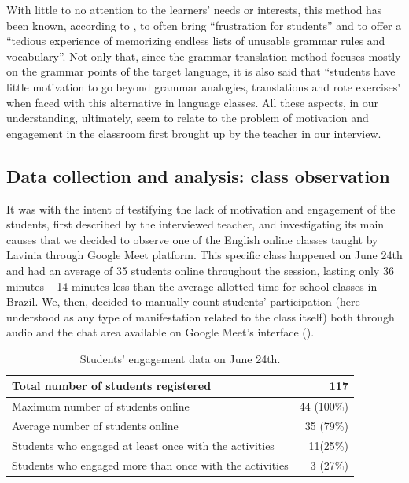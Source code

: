 \documentclass[english]{textolivre}
\begin{document}
With little to no attention to the learners’ needs or interests, this method has been known, according to \textcite[p. 7]{richards2014approaches}, to often bring “frustration for students” and to offer a “tedious experience of memorizing endless lists of unusable grammar rules and vocabulary”. Not only that, since the grammar-translation method focuses mostly on the grammar points of the target language, it is also said that “students have little motivation to go beyond grammar analogies, translations and rote exercises" \cite[p. 19]{brown2000douglas} when faced with this alternative in language classes. All these aspects, in our understanding, ultimately, seem to relate to the problem of motivation and engagement in the classroom first brought up by the teacher in our interview.


\subsection{Data collection and analysis: class observation}

It was with the intent of testifying the lack of motivation and engagement of the students, first described by the interviewed teacher, and investigating its main causes that we decided to observe one of the English online classes taught by Lavinia through Google Meet platform. This specific class happened on June 24th and had an average of 35 students online throughout the session, lasting only 36 minutes – 14 minutes less than the average allotted time for school classes in Brazil. We, then, decided to manually count students’ participation (here understood as any type of manifestation related to the class itself) both through audio and the chat area available on Google Meet’s interface ().

\begin{table}[h!]
\centering
\begin{threeparttable}
\caption{Students’ engagement data on June 24th.}
\label{tab1}
\begin{tabular}{lr}
\toprule
Total number of students registered & 117         \\
\midrule
Maximum number of students online & 44 (100\%)           \\
Average number of students online & 35 (79\%)            \\
Students who engaged at least once with the activities & 11(25\%)  \\
Students who engaged more than once with the activities & 3 (27\%) \\
\bottomrule
\end{tabular}
\end{threeparttable}
\end{table}
\end{document}
